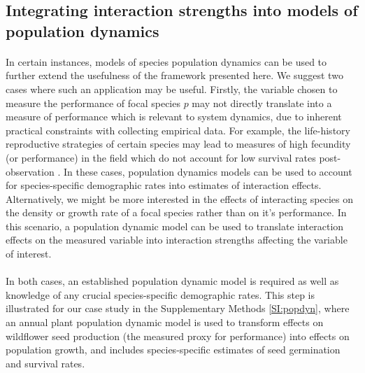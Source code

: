 \documentclass[a4,12pt]{article}
\begin{document}
\begin{refsection}
    \subsection{Integrating interaction strengths into models of population dynamics}

        \paragraph{}
        In certain instances, models of species population dynamics can be used to further extend the usefulness of the framework presented here. We suggest two cases where such an application may be useful. Firstly, the variable chosen to measure the performance of focal species $p$ may not directly translate into a measure of performance which is relevant to system dynamics,  due to inherent practical constraints with collecting empirical data. For example, the life-history reproductive strategies of certain species may lead to measures of high fecundity (or performance) in the field which do not account for low survival rates post-observation \parencite{Broekman2020}. In these cases, population dynamics models can be used to account for species-specific demographic rates into estimates of interaction effects. Alternatively, we might be more interested in the effects of interacting species on the density or growth rate of a focal species rather than on it's performance. In this scenario, a population dynamic model can be used to translate interaction effects on the measured variable into interaction strengths affecting the variable of interest. 

        \paragraph{}
        In both cases, an established population dynamic model is required as well as knowledge of any crucial species-specific demographic rates. This step is illustrated for our case study in the Supplementary Methods \ref{SI:popdyn}, where an annual plant population dynamic model is used to transform effects on wildflower seed production (the measured proxy for performance) into effects on population growth, and includes species-specific estimates of seed germination and survival rates. 




\end{refsection}
\end{document}
